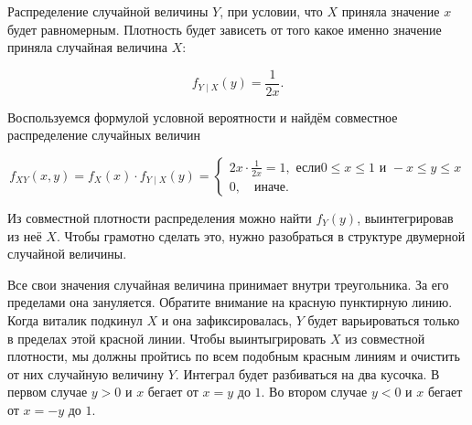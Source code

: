 \documentclass[12pt, a4paper, oneside]{article}
\begin{document}
\begin{sol}

 Распределение случайной величины $Y$, при условии, что $X$ приняла значение $x$ будет равномерным.  Плотность будет зависеть от того какое именно значение приняла случайная величина $X$: 

\[f_{Y \mid X}(y) = \frac{1}{2x}.\]

 Воспользуемся формулой условной вероятности и найдём совместное 	распределение случайных величин

\[f_{XY} (x,y) = f_X(x) \cdot f_{Y \mid X} (y) =  \begin{cases} 2x \cdot \frac{1}{2x} = 1, \text{ если} 0 \le x \le 1 \text{ и } -x \le y \le x  \\ 0, \quad \text{иначе}. \end{cases} \]

 Из совместной плотности распределения можно найти $f_Y(y)$, выинтегрировав из неё $X$. Чтобы грамотно сделать это, нужно разобраться в структуре двумерной случайной величины. 

\begin{center}
\end{center} 

Все свои значения случайная величина принимает внутри треугольника. За его пределами она зануляется. Обратите внимание на красную пунктирную линию. Когда виталик подкинул $X$ и она зафиксировалась, $Y$ будет варьироваться только в пределах этой красной линии. Чтобы выинтыгрировать $X$ из совместной плотности, мы должны пройтись по всем подобным красным линиям и очистить от них случайную величину $Y$.  Интеграл будет разбиваться на два кусочка. В первом случае $y > 0$ и $x$ бегает от $x = y$ до $1$. Во втором случае $ y < 0$ и $x$ бегает от $x = -y$ до $1$. 


\end{sol}
\end{document}
